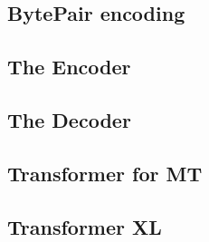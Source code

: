 


\subsection{BytePair encoding}


\subsection{The Encoder}


\subsection{The Decoder}


\subsection{Transformer for MT}


\subsection{Transformer XL}


